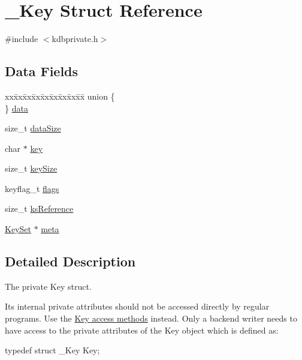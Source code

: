 \hypertarget{struct__Key}{
\section{\_\-Key Struct Reference}
\label{struct__Key}
}


{\ttfamily \#include $<$kdbprivate.h$>$}

\subsection*{Data Fields}
\begin{DoxyCompactItemize}
\item 
\begin{tabbing}
xx\=xx\=xx\=xx\=xx\=xx\=xx\=xx\=xx\=\kill
union \{\\
\} \hyperlink{struct__Key_adc2c86e77553ed8224c9516487299459}{data}\\

\end{tabbing}\item 
size\_\-t \hyperlink{struct__Key_a4fd6239c6f82dd78181d6b497ff30f7e}{dataSize}
\item 
char $\ast$ \hyperlink{struct__Key_a652aa968b98b0797d4d080b51133fed9}{key}
\item 
size\_\-t \hyperlink{struct__Key_ab05bb76f9e389692dcea59f581e76323}{keySize}
\item 
keyflag\_\-t \hyperlink{struct__Key_a84a30dda173b302305eca6af5f766bc7}{flags}
\item 
size\_\-t \hyperlink{struct__Key_ab8fe2e580d4ab3952a071c25550598ef}{ksReference}
\item 
\hyperlink{struct__KeySet}{KeySet} $\ast$ \hyperlink{struct__Key_ad1596880712126bad997404b176872f5}{meta}
\end{DoxyCompactItemize}


\subsection{Detailed Description}
The private Key struct.

Its internal private attributes should not be accessed directly by regular programs. Use the \hyperlink{group__key}{Key access methods} instead. Only a backend writer needs to have access to the private attributes of the Key object which is defined as: 
\begin{DoxyCode}
typedef struct _Key Key;
\end{DoxyCode}
 

